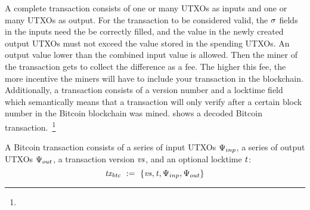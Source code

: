 \begin{center}
    \fbox{
    \begin{varwidth}{\textwidth}
        \procedure[linenumbering]{$\procCreateUTXO{\varValue}{\varScriptPubKey}$} {
        \pcreturn \varUTXO \opAssign \{ \varValue \opAssign \varValue, \varScriptPubKey \opAssign \varScriptPubKey,
        \varScriptSig \opAssign \cnstEmptySet \}
        } \\
        \procedure[linenumbering]{$\procSpendUTXO{\varUTXO}{\varScriptSig}$} {
        \{ \varValue, \varScriptPubKey \} \opFunResult \varUTXO \\
        \pcreturn \varUTXO \opAssign \{ \varValue \opAssign \varValue, \varScriptPubKey \opAssign \varScriptPubKey,
        \varScriptSig \opAssign \varScriptSig \}
        } \\
        \procedure[linenumbering]{$\procVerfUTXO{\varUTXO}$} {
        \{ \varValue, \varScriptPubKey, \varScriptSig \} \opFunResult \varUTXO \\
        \pcreturn \procVerf{\varScriptPubKey}{\varScriptSig}{\varValue}
        }
    \end{varwidth}
    }
\end{center}

A complete transaction consists of one or many UTXOs as inputs and one or many UTXOs as output.
For the transaction to be considered valid, the $\mathit{\sigma}$ fields in the inputs need the be correctly filled, and the value in the newly created output UTXOs must not exceed the value stored in the spending UTXOs.
An output value lower than the combined input value is allowed.
Then the miner of the transaction gets to collect the difference as a fee.
The higher this fee, the more incentive the miners will have to include your transaction in the blockchain.
Additionally, a transaction consists of a version number and a locktime field which semantically means that a transaction will only verify after a certain block number in the Bitcoin blockchain was mined.
 shows a decoded Bitcoin transaction.~\footnote{\urlbtcbook}

\begin{definition}
    A Bitcoin transaction consists of a series of input UTXOs $\Psi_{inp}$, a series of output UTXOs $\Psi_{out}$, a
    transaction version $\mathit{vs}$, and an optional locktime $\mathit{t}$:
    \[ \mathit{tx_{btc}} ~:=~ \{ \mathit{vs}, \mathit{t}, \Psi_{inp}, \Psi_{out} \} \]
\end{definition}

